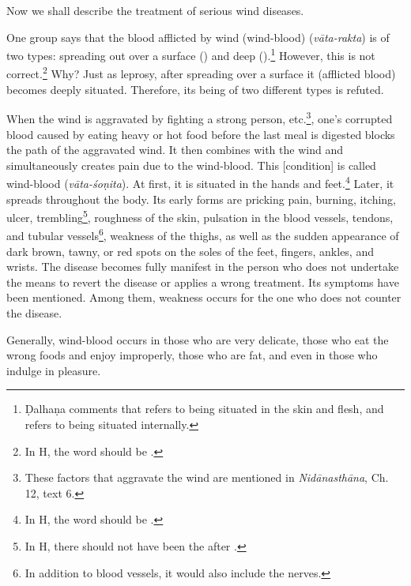 \begin{translation}
    
    \item [1]
    Now we shall describe the treatment of serious wind diseases.
    
    \item [2]

    \item [3]
    One group says that the blood afflicted by wind (wind-blood) (\textit{vāta-rakta}) is of two types: spreading out over a surface () and deep ().\footnote{Ḍalhaṇa comments \citep[424]{vulgate} that  refers to being situated in the skin and flesh, and  refers to being situated internally.} However, this is not correct.\footnote{In H, the word  should be .} Why? Just as leprosy, after spreading over a surface it (afflicted blood) becomes deeply situated. Therefore, its being of two different types is refuted.  

    \item[4]
    When the wind is aggravated by fighting a strong person, etc.\footnote{These factors that aggravate the wind are mentioned in \textit{Nidānasthāna}, Ch. 12, text 6.}, one's corrupted blood caused by eating heavy or hot food before the last meal is digested blocks the path of the aggravated wind. It then combines with the wind and simultaneously creates pain due to the wind-blood. This [condition] is called wind-blood (\textit{vāta-śoṇita}). At first, it is situated in the hands and feet.\footnote{In H, the word  should be .} Later, it spreads throughout the body. Its early forms are pricking pain, burning, itching, ulcer, trembling\footnote{In H, there should not have been the  after .}, roughness of the skin, pulsation in the blood vessels, tendons, and tubular vessels\footnote{In addition to blood vessels, it would also include the nerves.}, weakness of the thighs, as well as the sudden appearance of dark brown, tawny, or red spots on the soles of the feet, fingers, ankles, and wrists. The disease becomes fully manifest in the person who does not undertake the means to revert the disease or applies a wrong treatment. Its symptoms have been mentioned. Among them, weakness occurs for the one who does not counter the disease.

    \item[5]
    Generally, wind-blood occurs in those who are very delicate, those who eat the wrong foods and enjoy improperly, those who are fat, and even in those who indulge in pleasure.  


\end{translation}

